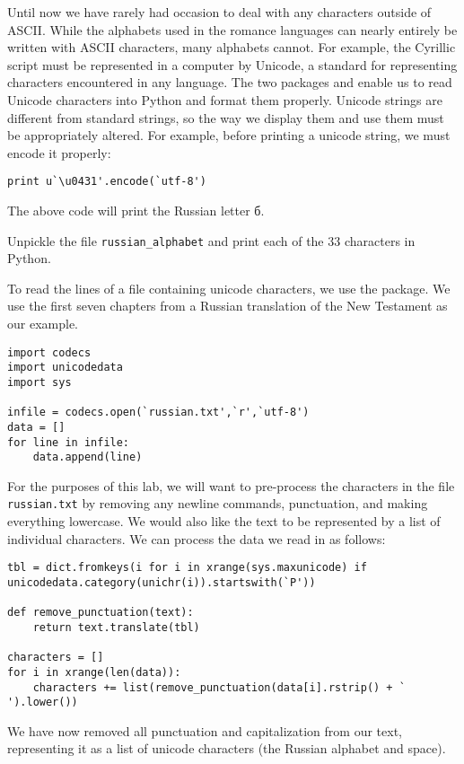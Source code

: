 
Until now we have rarely had occasion to deal with any characters outside of ASCII. While the alphabets used in the romance languages can nearly entirely be written with ASCII characters, many alphabets cannot. For example, the Cyrillic script must be represented in a computer by Unicode, a standard for representing characters encountered in any language. The two packages  and  enable us to read Unicode characters into Python and format them properly.
Unicode strings are different from standard strings, so the way we display them and use them must be appropriately altered. For example, before printing a unicode string, we must encode it properly:
\begin{lstlisting}
print u`\u0431'.encode(`utf-8')
\end{lstlisting}
The above code will print the Russian letter б.

\begin{problem}
Unpickle the file \texttt{russian\_alphabet} and print each of the 33 characters in Python.
\end{problem}

To read the lines of a file containing unicode characters, we use the  package. We use the first seven chapters from a Russian translation of the New Testament as our example.
\begin{lstlisting}
import codecs
import unicodedata
import sys

infile = codecs.open(`russian.txt',`r',`utf-8')
data = []
for line in infile:
	data.append(line)
\end{lstlisting}
For the purposes of this lab, we will want to pre-process the characters in the file \texttt{russian.txt} by removing any newline commands, punctuation, and making everything lowercase. We would also like the text to be represented by a list of individual characters. We can process the data we read in as follows:
\begin{lstlisting}
tbl = dict.fromkeys(i for i in xrange(sys.maxunicode) if unicodedata.category(unichr(i)).startswith(`P'))

def remove_punctuation(text):
	return text.translate(tbl)

characters = []
for i in xrange(len(data)):
	characters += list(remove_punctuation(data[i].rstrip() + ` ').lower())
\end{lstlisting}
We have now removed all punctuation and capitalization from our text, representing it as a list of unicode characters (the Russian alphabet and space).


